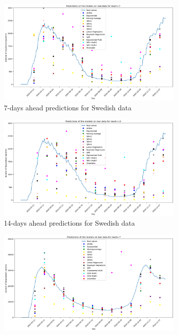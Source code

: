 \begin{figure}[h!]
  \centering
  \begin{subfigure}[b]{0.5\textwidth}
      \centering
      \includegraphics[width=\textwidth]{figures/real_data_sweden_7.png}  
      \caption{7-days ahead predictions for Swedish data}
      \label{fig:sousfig1g}
    \end{subfigure}
    \hfill
    \begin{subfigure}[b]{0.5\textwidth}
      \centering
      \includegraphics[width=\textwidth]{figures/real_data_sweden_14.png}  
      \caption{14-days ahead predictions for Swedish data}
      \label{fig:sousfig2g}
    \end{subfigure}
    \begin{subfigure}[b]{0.5\textwidth}
      \centering
      \includegraphics[width=\textwidth]{figures/real_data_France_7.png}  

\end{subfigure}
\end{figure}
